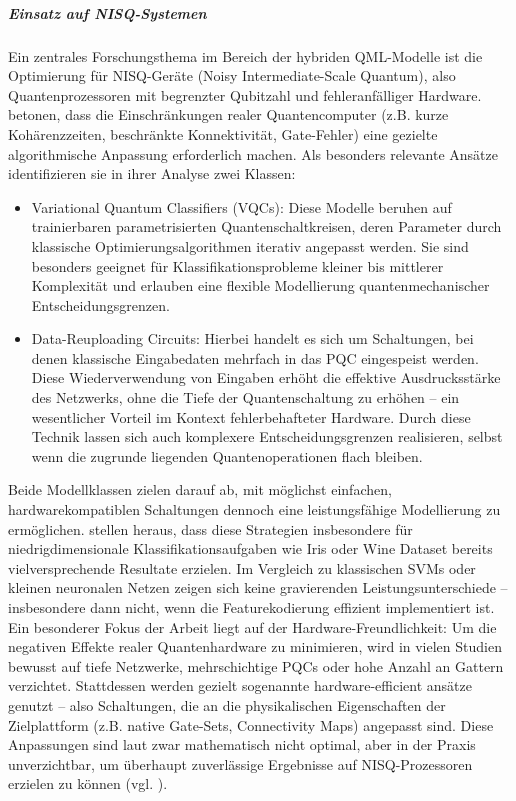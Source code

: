 \subparagraph{Einsatz auf NISQ-Systemen}
Ein zentrales Forschungsthema im Bereich der hybriden QML-Modelle ist die Optimierung für NISQ-Geräte (Noisy Intermediate-Scale Quantum), also Quantenprozessoren mit begrenzter Qubitzahl und fehleranfälliger Hardware. \cite{gujjuQuantumMachineLearning2024} betonen, dass die Einschränkungen realer Quantencomputer (z.B. kurze Kohärenzzeiten, beschränkte Konnektivität, Gate-Fehler) eine gezielte algorithmische Anpassung erforderlich machen. Als besonders relevante Ansätze identifizieren sie in ihrer Analyse zwei Klassen:
\begin{itemize}
  \item Variational Quantum Classifiers (VQCs): Diese Modelle beruhen auf trainierbaren parametrisierten Quantenschaltkreisen, deren Parameter durch klassische Optimierungsalgorithmen iterativ angepasst werden. Sie sind besonders geeignet für Klassifikationsprobleme kleiner bis mittlerer Komplexität und erlauben eine flexible Modellierung quantenmechanischer Entscheidungsgrenzen.
  \vspace{0.5em}
  \item Data-Reuploading Circuits: Hierbei handelt es sich um Schaltungen, bei denen klassische Eingabedaten mehrfach in das PQC eingespeist werden. Diese Wiederverwendung von Eingaben erhöht die effektive Ausdrucksstärke des Netzwerks, ohne die Tiefe der Quantenschaltung zu erhöhen – ein wesentlicher Vorteil im Kontext fehlerbehafteter Hardware. Durch diese Technik lassen sich auch komplexere Entscheidungsgrenzen realisieren, selbst wenn die zugrunde liegenden Quantenoperationen flach bleiben.
\end{itemize}
Beide Modellklassen zielen darauf ab, mit möglichst einfachen, hardwarekompatiblen Schaltungen dennoch eine leistungsfähige Modellierung zu ermöglichen. \cite{gujjuQuantumMachineLearning2024} stellen heraus, dass diese Strategien insbesondere für niedrigdimensionale Klassifikationsaufgaben wie Iris oder Wine Dataset bereits vielversprechende Resultate erzielen. Im Vergleich zu klassischen SVMs oder kleinen neuronalen Netzen zeigen sich keine gravierenden Leistungsunterschiede – insbesondere dann nicht, wenn die Featurekodierung effizient implementiert ist.
Ein besonderer Fokus der Arbeit liegt auf der Hardware-Freundlichkeit: Um die negativen Effekte realer Quantenhardware zu minimieren, wird in vielen Studien bewusst auf tiefe Netzwerke, mehrschichtige PQCs oder hohe Anzahl an Gattern verzichtet. Stattdessen werden gezielt sogenannte hardware-efficient ansätze genutzt – also Schaltungen, die an die physikalischen Eigenschaften der Zielplattform (z.B. native Gate-Sets, Connectivity Maps) angepasst sind. Diese Anpassungen sind laut \cite{gujjuQuantumMachineLearning2024} zwar mathematisch nicht optimal, aber in der Praxis unverzichtbar, um überhaupt zuverlässige Ergebnisse auf NISQ-Prozessoren erzielen zu können (vgl. \cite{gujjuQuantumMachineLearning2024}).


